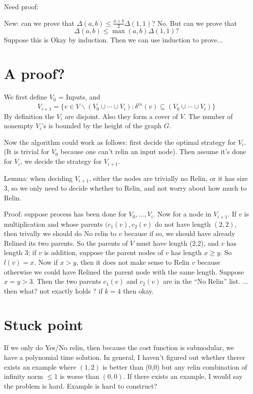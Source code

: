 \documentclass[11pt]{article} %
\theoremstyle{plain}
\theoremstyle{definition}
\begin{document}
Need proof: 

New: can we prove that $\Delta(a,b) \leq \frac{a+b}{2} \Delta(1,1)$?  No. But can we prove that 
$$\Delta(a,b) \leq \max(a,b) \Delta(1,1)?$$ Suppose this is Okay by induction. Then we can use induction
to prove...

\section{A proof?}

We first define $V_0$ = Inputs, and 
\[
	V_{i+1}   = \{ v \in V \backslash (V_0 \cup \cdots \cup V_i): \delta^{in}(v) \subseteq  (V_0 \cup \cdots \cup V_i) \}
\]
By definition the $V_i$ are disjoint. Also they form a cover of $V$. The number of nonempty $V_i$'s is 
bounded by the height of the graph $G$. 

Now the algorithm could work as follows: first decide the optimal strategy for $V_i$. (It is trivial 
for $V_0$ because one can't relin an input node). Then assume it's done for $V_i$, we decide 
the strategy for $V_{i+1}$. 

Lemma: when deciding $V_{i+1}$, either the nodes are trivially no Relin, or it has size 3, so we only need
to decide whether to Relin, and not worry about how much to Relin.

Proof: suppose process has been done for $V_0, \ldots, V_i$. Now for a node in $V_{i+1}$. If $v$ is 
multiplication and whose parents $(c_1(v), c_2(v)$ do not have length $(2,2)$, then trivally we should do No relin to $v$ because if so, we 
should have already Relined its two parents.  So the parents of $V$ must have length (2,2), and $v$ has 
length 3; if $v$ is addition, suppose the parent nodes of $v$ has length $x \geq y$.  So $l(v) = x$.  Now if 
$x > y$, then it does not make sense to Relin $v$ because otherwise we could have Relined the parent node with the same length. Suppose $x = y > 3$. Then the two parents $c_1(v)$ and $c_2(v)$  are in the 
``No Relin'' list. ... then what? not exactly holds ?  if $k = 4$ then okay. 

\section{Stuck point}

If we only do Yes/No relin, then because the cost function is submodular, we have a polynomial time solution. In general, I haven't figured out whether therer exists an example where $(1,2)$ is better than 
(0,0) but any relin combination of infinity norm $\leq 1$ is worse than $(0,0)$. If there exists an example,
I would say the problem is hard. Example is hard to construct? 
\end{document}
